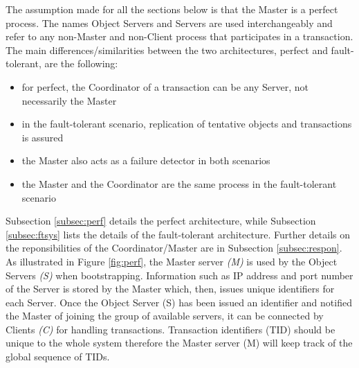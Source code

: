 \documentclass[times, 10pt,twocolumn]{article}
\begin{document}
The assumption made for all the sections below is that the Master is a perfect process. The names Object Servers and Servers are used interchangeably and refer to any non-Master and non-Client process that participates in a transaction.
The main differences/similarities between the two architectures, perfect and fault-tolerant, are the following:
\begin{itemize}[noitemsep,nolistsep]
\item for perfect, the Coordinator of a transaction can be any Server, not necessarily the Master
\item in the fault-tolerant scenario, replication of tentative objects and transactions is assured
\item the Master also acts as a failure detector in both scenarios 
\item the Master and the Coordinator are the same process in the fault-tolerant scenario
\end{itemize}

Subsection \ref{subsec:perf} details the perfect architecture, while Subsection \ref{subsec:ftsys} lists the details of the fault-tolerant architecture. Further details on the reponsibilities of the Coordinator/Master are in Subsection \ref{subsec:respon}.
\label{subsec:perf}
As illustrated in Figure \ref{fig:perf}, the Master server {\it(M)} is used by the Object Servers {\it(S)} when bootstrapping. Information such as
IP address and port number of the Server is stored by the Master which, then, issues unique identifiers for each Server. Once the Object Server (S) has been issued an identifier and notified the Master of joining the group of available servers, it can be connected by Clients {\it(C)} for handling transactions. Transaction identifiers (TID) should be unique to the whole system therefore the Master server (M) will keep track of the global sequence of TIDs.
\end{document}
